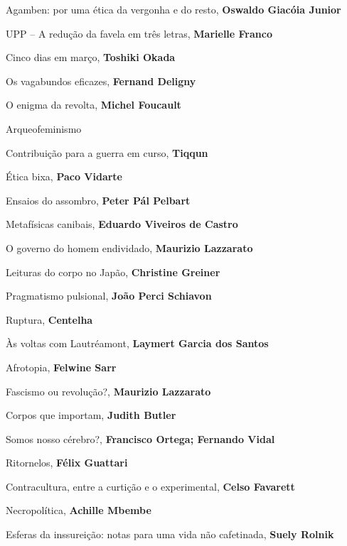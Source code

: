 \begin{multicols}{2}
\begin{enumerate}
{\item Agamben: por uma ética da vergonha e do resto, \textbf{Oswaldo Giacóia Junior}
\item UPP -- A redução da favela em três letras, \textbf{Marielle Franco}
\item Cinco dias em março, \textbf{Toshiki Okada}
\item Os vagabundos eficazes, \textbf{Fernand Deligny}
\item O enigma da revolta, \textbf{Michel Foucault}
\item Arqueofeminismo
\item Contribuição para a guerra em curso, \textbf{Tiqqun}
\item Ética bixa, \textbf{Paco Vidarte}
\item Ensaios do assombro, \textbf{Peter Pál Pelbart}
\item Metafísicas canibais, \textbf{Eduardo Viveiros de Castro}
\item O governo do homem endividado, \textbf{Maurizio Lazzarato}
\item Leituras do corpo no Japão, \textbf{Christine Greiner}
\item Pragmatismo pulsional, \textbf{João Perci Schiavon}
\item Ruptura, \textbf{Centelha}
\item Às voltas com Lautréamont, \textbf{Laymert Garcia dos Santos}
\item Afrotopia, \textbf{Felwine Sarr}
\item Fascismo ou revolução?, \textbf{Maurizio Lazzarato}
\item Corpos que importam, \textbf{Judith Butler}
\item Somos nosso cérebro?, \textbf{Francisco Ortega; Fernando Vidal}
\item Ritornelos, \textbf{Félix Guattari}
\item Contracultura, entre a curtição e o experimental, \textbf{Celso Favarett}
\item Necropolítica, \textbf{Achille Mbembe}
\item Esferas da inssureição: notas para uma vida não cafetinada, \textbf{Suely Rolnik}

}
\end{enumerate}
\end{multicols}

\pagebreak